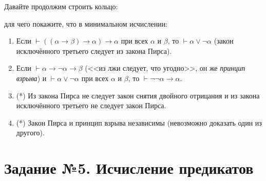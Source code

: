 \documentclass[10pt,a4paper,oneside]{article}
\begin{document}
\begin{enumerate}
Давайте продолжим строить кольцо:

\begin{center}\end{center}

для чего покажите, что в минимальном исчислении:
\begin{enumerate}
\item Если $\vdash((\alpha\rightarrow\beta)\rightarrow\alpha)\rightarrow\alpha$ при всех $\alpha$ и $\beta$, то
$\vdash\alpha\vee\neg\alpha$ (закон исключённого третьего следует из закона Пирса).
\item Если $\vdash\alpha\rightarrow\neg\alpha\rightarrow\beta$ (<<из лжи следует, что угодно>>, 
он же \emph{принцип взрыва}) и $\vdash\alpha\vee\neg\alpha$ при всех $\alpha$ и $\beta$, то $\vdash\neg\neg\alpha\rightarrow\alpha$.
\item (*) Из закона Пирса не следует закон снятия двойного отрицания и из закона исключённого третьего не следует закон Пирса.
\item (*) Закон Пирса и принцип взрыва независимы (невозможно доказать один из другого).
\end{enumerate}

\end{enumerate}


\section*{Задание №5. Исчисление предикатов}
\end{document}
